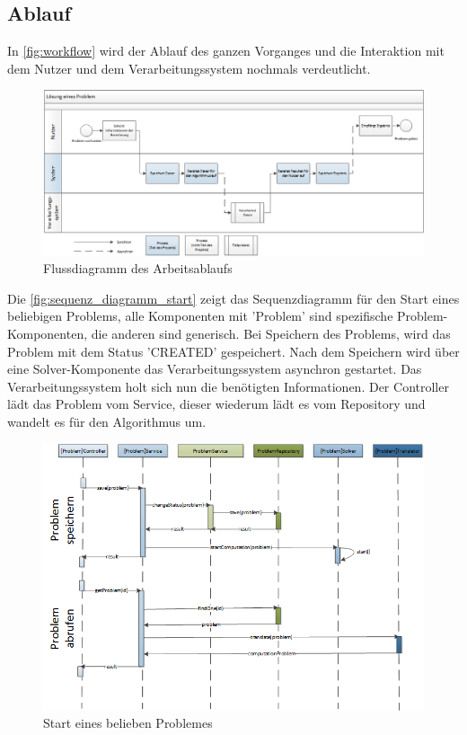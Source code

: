 \begin{landscape}
\subsection{Ablauf}
\thispagestyle{empty}
In \autoref{fig:workflow} wird der Ablauf des ganzen Vorganges und die Interaktion mit dem Nutzer und dem Verarbeitungssystem nochmals verdeutlicht.

\begin{figure}[h]
\centering
\includegraphics[scale=0.8]{images/visio/workflow.png}
\caption[Flussdiagramm des Arbeitsablaufs]{Flussdiagramm des Arbeitsablaufs \selfmade{}}
\label{fig:workflow}
\end{figure}

\end{landscape}


Die \autoref{fig:sequenz_diagramm_start} zeigt das Sequenzdiagramm für den Start eines beliebigen Problems, alle Komponenten mit '{Problem}' sind spezifische Problem-Komponenten, 
die anderen sind generisch. Bei Speichern des Problems, wird das Problem mit dem Status 'CREATED' gespeichert. Nach dem Speichern wird über eine Solver-Komponente das 
Verarbeitungssystem asynchron gestartet. Das Verarbeitungssystem holt sich nun die benötigten Informationen. Der Controller lädt das Problem vom Service, dieser wiederum lädt es vom 
Repository und wandelt es für den Algorithmus um.

\begin{figure}[h]
\centering
\includegraphics[scale=0.8]{images/visio/sequenz_diagramm_start.png}
\caption[Start eines belieben Problemes]{Start eines belieben Problemes \selfmade{}}
\label{fig:sequenz_diagramm_start}
\end{figure}

